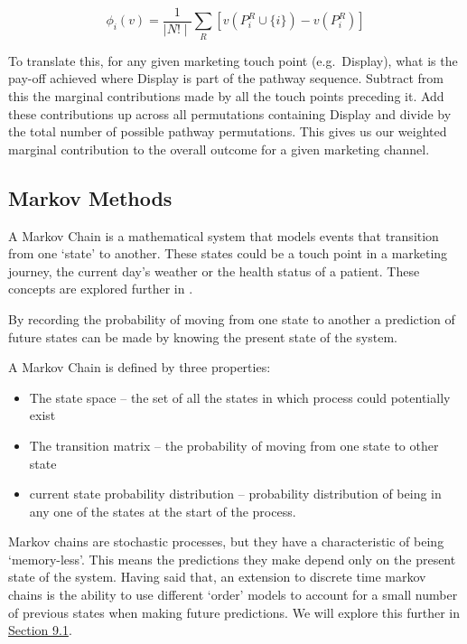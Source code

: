 \documentclass[]{book}
\providecommand{\tightlist}{%
  \setlength{\itemsep}{0pt}\setlength{\parskip}{0pt}}
\begin{document}
\[
\phi_i(v) = \frac{1}{\mid{N!}\mid}\sum_{R}[v(P_i^R \cup \{i\}) - v(P_i^R)]
\]

To translate this, for any given marketing touch point (e.g.~Display),
what is the pay-off achieved where Display is part of the pathway
sequence. Subtract from this the marginal contributions made by all the
touch points preceding it. Add these contributions up across all
permutations containing Display and divide by the total number of
possible pathway permutations. This gives us our weighted marginal
contribution to the overall outcome for a given marketing channel.

\hypertarget{markov-methods}{\subsection{Markov
Methods}\label{markov-methods}}

A Markov Chain is a mathematical system that models events that
transition from one `state' to another. These states could be a touch
point in a marketing journey, the current day's weather or the health
status of a patient. These concepts are explored further in
\citep{gagniuc2017markov}.

By recording the probability of moving from one state to another a
prediction of future states can be made by knowing the present state of
the system.

A Markov Chain is defined by three properties:

\begin{itemize}
\tightlist
\item
  The state space -- the set of all the states in which process could
  potentially exist
\item
  The transition matrix -- the probability of moving from one state to
  other state
\item
  current state probability distribution -- probability distribution of
  being in any one of the states at the start of the process.
\end{itemize}

Markov chains are stochastic processes, but they have a characteristic
of being `memory-less'. This means the predictions they make depend only
on the present state of the system. Having said that, an extension to
discrete time markov chains is the ability to use different `order'
models to account for a small number of previous states when making
future predictions. We will explore this further in
\protect\hyperlink{markov-chains}{Section 9.1}.
\end{document}
